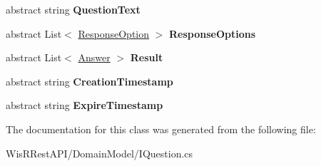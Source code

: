 \begin{DoxyCompactItemize}
\item 
\hypertarget{class_wis_r_1_1_domain_models_1_1_question_a5a838fae02c6cec4f97b3c02d82e23c9}{}abstract string {\bfseries Question\+Text}\label{class_wis_r_1_1_domain_models_1_1_question_a5a838fae02c6cec4f97b3c02d82e23c9}

\item 
\hypertarget{class_wis_r_1_1_domain_models_1_1_question_a1cb6bbfb00d4e53510ac182a1e0e3e31}{}abstract List$<$ \hyperlink{class_wis_r_1_1_domain_models_1_1_response_option}{Response\+Option} $>$ {\bfseries Response\+Options}\label{class_wis_r_1_1_domain_models_1_1_question_a1cb6bbfb00d4e53510ac182a1e0e3e31}

\item 
\hypertarget{class_wis_r_1_1_domain_models_1_1_question_a0376a385914dc8a557dfac229a0cee03}{}abstract List$<$ \hyperlink{class_wis_r_1_1_domain_models_1_1_answer}{Answer} $>$ {\bfseries Result}\label{class_wis_r_1_1_domain_models_1_1_question_a0376a385914dc8a557dfac229a0cee03}

\item 
\hypertarget{class_wis_r_1_1_domain_models_1_1_question_aac7e3a817946f7c89752c50206986780}{}abstract string {\bfseries Creation\+Timestamp}\label{class_wis_r_1_1_domain_models_1_1_question_aac7e3a817946f7c89752c50206986780}

\item 
\hypertarget{class_wis_r_1_1_domain_models_1_1_question_ac5881e7fce30b77a6ab3b74d68281624}{}abstract string {\bfseries Expire\+Timestamp}\label{class_wis_r_1_1_domain_models_1_1_question_ac5881e7fce30b77a6ab3b74d68281624}

\end{DoxyCompactItemize}


The documentation for this class was generated from the following file\+:\begin{DoxyCompactItemize}
\item 
Wis\+R\+Rest\+A\+P\+I/\+Domain\+Model/I\+Question.\+cs\end{DoxyCompactItemize}
